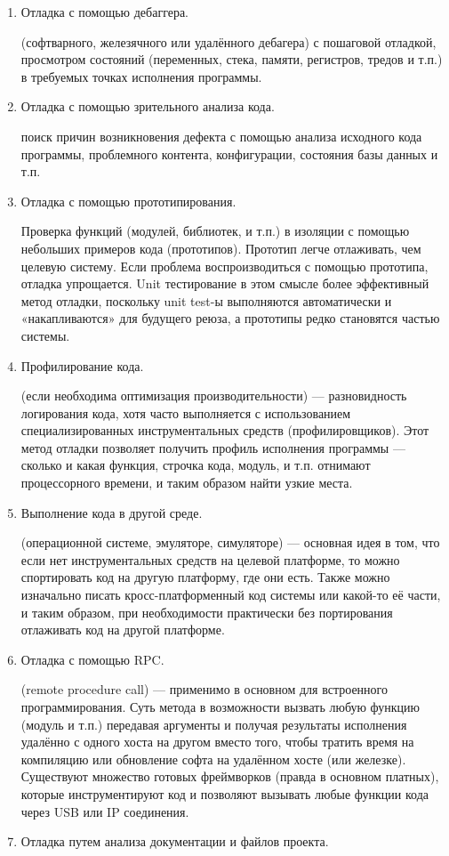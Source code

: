 \documentclass[a4paper]{article}
\begin{document}
\begin{enumerate}
  \item Отладка с помощью дебаггера.

        (софтварного, железячного или удалённого дебагера) с пошаговой отладкой, просмотром состояний (переменных, стека, памяти, регистров, тредов и т.п.) в требуемых точках исполнения программы.
  \item Отладка с помощью зрительного анализа кода.

        поиск причин возникновения дефекта с помощью анализа исходного кода программы, проблемного контента, конфигурации, состояния базы данных и т.п.
  \item Отладка с помощью прототипирования.

        Проверка функций (модулей, библиотек, и т.п.) в изоляции с помощью небольших примеров кода (прототипов). Прототип легче отлаживать, чем целевую систему. Если проблема воспроизводиться с помощью прототипа, отладка упрощается. Unit тестирование в этом смысле более эффективный метод отладки, поскольку unit test-ы выполняются автоматически и «накапливаются» для будущего реюза, а прототипы редко становятся частью системы.
  \item Профилирование кода.

        (если необходима оптимизация производительности) — разновидность логирования кода, хотя часто выполняется с использованием специализированных инструментальных средств (профилировщиков). Этот метод отладки позволяет получить профиль исполнения программы — сколько и какая функция, строчка кода, модуль, и т.п. отнимают процессорного времени, и таким образом найти узкие места.
  \item Выполнение кода в другой среде.

        (операционной системе, эмуляторе, симуляторе) — основная идея в том, что если нет инструментальных средств на целевой платформе, то можно спортировать код на другую платформу, где они есть. Также можно изначально писать кросс-платформенный код системы или какой-то её части, и таким образом, при необходимости практически без портирования отлаживать код на другой платформе.
  \item Отладка с помощью RPC.

         (remote procedure call)  — применимо в основном для встроенного программирования. Суть метода в возможности вызвать любую функцию (модуль и т.п.) передавая аргументы и получая результаты исполнения удалённо с одного хоста на другом вместо того, чтобы тратить время на компиляцию или обновление софта на удалённом хосте (или железке). Существуют множество готовых фреймворков (правда в основном платных), которые инструментируют код и позволяют вызывать любые функции кода через USB или IP соединения.
  \item Отладка путем анализа документации и файлов проекта.


\end{enumerate}
\end{document}

